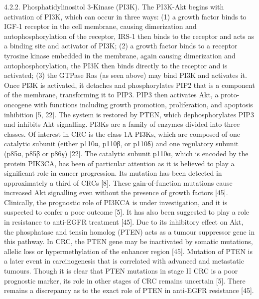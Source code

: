   4.2.2. Phosphatidylinositol 3-Kinase (PI3K). The PI3K-Akt begins with
    activation of PI3K, which can occur in three ways: (1) a growth factor binds
    to IGF-1 receptor in the cell membrane, causing dimerization and
    autophosphorylation of the receptor, IRS-1 then binds to the receptor and acts
    as a binding site and activator of PI3K; (2) a growth factor binds to a
    receptor tyrosine kinase embedded in the membrane, again causing dimerization
    and autophosphorylation, the PI3K then binds directly to the receptor and is
    activated; (3) the GTPase Ras (as seen above) may bind PI3K and activates it.
    Once PI3K is activated, it detaches and phosphorylates PIP2 that is a
    component of the membrane, transforming it to PIP3. PIP3 then activates Akt, a
    proto-oncogene with functions including growth promotion, proliferation, and
    apoptosis inhibition [5, 22]. The system is restored by PTEN, which
    dephosphorylates PIP3 and inhibits Akt signalling. PI3Ks are a family of
    enzymes divided into three classes. Of interest in CRC is the class 1A PI3Ks,
    which are composed of one catalytic subunit (either p110α, p110β, or p110δ)
    and one regulatory subunit (p85α, p85β or p86γ) [22]. The catalytic subunit
    p110α, which is encoded by the protein PIK3CA, has been of particular
    attention as it is believed to play a significant role in cancer
    progression. Its mutation has been detected in approximately a third of CRCs
    [8]. These gain-of-function mutations cause increased Akt signalling even
    without the presence of growth factors [45]. Clinically, the prognostic role
    of PI3KCA is under investigation, and it is suspected to confer a poor
    outcome [5]. It has also been suggested to play a role in resistance to
    anti-EGFR treatment [45]. Due to its inhibitory effect on Akt, the
    phosphatase and tensin homolog (PTEN) acts as a tumour suppressor gene in
    this pathway. In CRC, the PTEN gene may be inactivated by somatic mutations,
    allelic loss or hypermethylation of the enhancer region [45]. Mutation of
    PTEN is a later event in carcinogenesis that is correlated with advanced and
    metastatic tumours. Though it is clear that PTEN mutations in stage II CRC
    is a poor prognostic marker, its role in other stages of CRC remains
    uncertain [5]. There remains a discrepancy as to the exact role of PTEN in
    anti-EGFR resistance [45].


